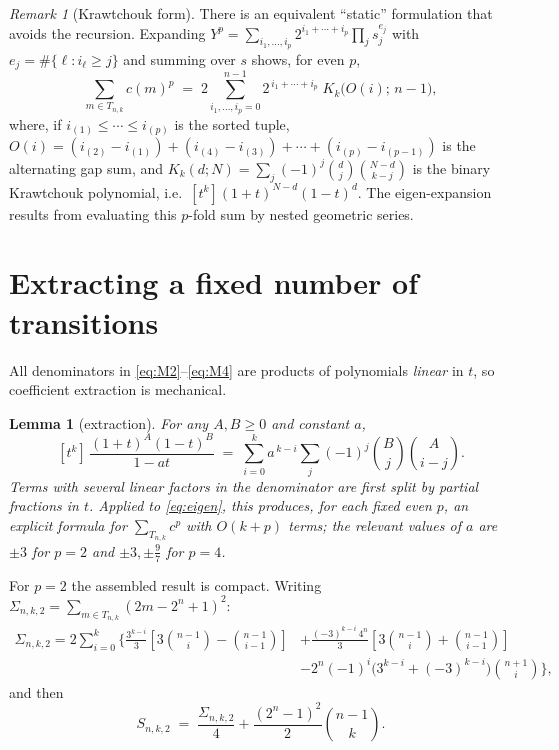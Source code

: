 \documentclass[11pt]{article}
\newtheorem{lemma}[theorem]{Lemma}
\theoremstyle{remark}
\newtheorem{remark}[theorem]{Remark}
\begin{document}
\begin{remark}[Krawtchouk form]
There is an equivalent ``static'' formulation that avoids the recursion. Expanding
$Y^p = \sum_{i_1, \dots, i_p} 2^{i_1 + \cdots + i_p} \prod_j s_j^{e_j}$ with
$e_j = \#\{ \ell : i_\ell \ge j \}$ and summing over $s$ shows, for even $p$,
\[
\sum_{m \in T_{n,k}} c(m)^p
\;=\; 2 \sum_{i_1, \dots, i_p = 0}^{n-1} 2^{\,i_1 + \cdots + i_p}\; K_k\bigl(O(i);\, n-1\bigr),
\]
where, if $i_{(1)} \le \cdots \le i_{(p)}$ is the sorted tuple,
$O(i) = (i_{(2)} - i_{(1)}) + (i_{(4)} - i_{(3)}) + \cdots + (i_{(p)} - i_{(p-1)})$ is the
alternating gap sum, and $K_k(d;N) = \sum_j (-1)^j \binom{d}{j}\binom{N - d}{k - j}$ is the binary
Krawtchouk polynomial, i.e.\ $[t^k](1+t)^{N-d}(1-t)^d$. The eigen-expansion results from
evaluating this $p$-fold sum by nested geometric series.
\end{remark}

\section{Extracting a fixed number of transitions}

All denominators in \eqref{eq:M2}--\eqref{eq:M4} are products of polynomials \emph{linear} in
$t$, so coefficient extraction is mechanical.

\begin{lemma}[extraction]\label{lem:extract}
For any $A, B \ge 0$ and constant $a$,
\[
[t^k]\, \frac{(1+t)^A (1-t)^B}{1 - a t}
\;=\; \sum_{i=0}^{k} a^{\,k-i} \sum_{j} (-1)^j \binom{B}{j} \binom{A}{i - j}.
\]
Terms with several linear factors in the denominator are first split by partial fractions in $t$.
Applied to \eqref{eq:eigen}, this produces, for each fixed even $p$, an explicit formula for
$\sum_{T_{n,k}} c^p$ with $O(k + p)$ terms; the relevant values of $a$ are $\pm 3$ for $p = 2$
and $\pm 3, \pm \tfrac{9}{7}$ for $p = 4$.
\end{lemma}

For $p = 2$ the assembled result is compact. Writing
$\Sigma_{n,k,2} = \sum_{m \in T_{n,k}} (2m - 2^n + 1)^2$:
\begin{equation}\label{eq:sigma2}
\begin{aligned}
\Sigma_{n,k,2} = 2 \sum_{i=0}^{k} \biggl\{
\frac{3^{k-i}}{3}\!\left[ 3\binom{n-1}{i} - \binom{n-1}{i-1} \right]
&+ \frac{(-3)^{k-i}\, 4^n}{3}\!\left[ 3\binom{n-1}{i} + \binom{n-1}{i-1} \right]\\[2pt]
&- 2^n (-1)^i \bigl( 3^{k-i} + (-3)^{k-i} \bigr) \binom{n+1}{i}
\biggr\},
\end{aligned}
\end{equation}
and then
\begin{equation}\label{eq:S2}
S_{n,k,2} \;=\; \frac{\Sigma_{n,k,2}}{4} + \frac{(2^n - 1)^2}{2} \binom{n-1}{k}.
\end{equation}
\end{document}
